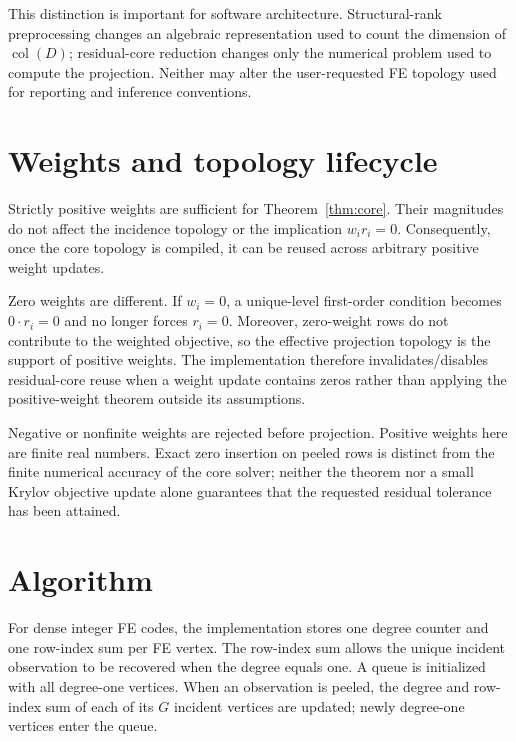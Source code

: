 \documentclass[11pt]{article}
\theoremstyle{definition}
\newcommand{\col}{\operatorname{col}}
\newcommand{\1}{\mathbf{1}}
\begin{document}
This distinction is important for software architecture. Structural-rank preprocessing changes an algebraic representation used to count the dimension of $\col(D)$; residual-core reduction changes only the numerical problem used to compute the projection. Neither may alter the user-requested FE topology used for reporting and inference conventions.

\section{Weights and topology lifecycle}

Strictly positive weights are sufficient for Theorem~\ref{thm:core}. Their magnitudes do not affect the incidence topology or the implication $w_i r_i=0$. Consequently, once the core topology is compiled, it can be reused across arbitrary positive weight updates.

Zero weights are different. If $w_i=0$, a unique-level first-order condition becomes $0\cdot r_i=0$ and no longer forces $r_i=0$. Moreover, zero-weight rows do not contribute to the weighted objective, so the effective projection topology is the support of positive weights. The implementation therefore invalidates/disables residual-core reuse when a weight update contains zeros rather than applying the positive-weight theorem outside its assumptions.

Negative or nonfinite weights are rejected before projection. Positive weights here are finite real numbers. Exact zero insertion on peeled rows is distinct from the finite numerical accuracy of the core solver; neither the theorem nor a small Krylov objective update alone guarantees that the requested residual tolerance has been attained.

\section{Algorithm}

For dense integer FE codes, the implementation stores one degree counter and one row-index sum per FE vertex. The row-index sum allows the unique incident observation to be recovered when the degree equals one. A queue is initialized with all degree-one vertices. When an observation is peeled, the degree and row-index sum of each of its $G$ incident vertices are updated; newly degree-one vertices enter the queue.
\end{document}
